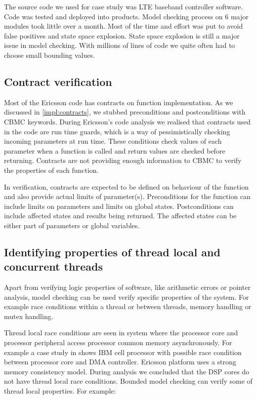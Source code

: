\ifericsson
The source code we used for case study was LTE baseband controller software. Code was tested and deployed into products. Model checking process on 6 major modules took little over a month. Most of the time and effort was put to avoid false positives and state space explosion. State space explosion is still a major issue in model checking. With millions of lines of code we quite often had to choose small bounding values.
\else

\fi

\subsection{Contract verification}
Most of the Ericsson code has contracts on function implementation. As we discussed in \autoref{impl:contracts}, we stubbed preconditions and postconditions with CBMC keywords. During Ericsson's code analysis we realised that contracts used in the code are run time guards, which is a way of pessimistically checking incoming parameters at run time. These conditions check values of each parameter when a function is called and return values are checked before returning. Contracts are not providing enough information to CBMC to verify the properties of each function. 

In verification, contracts are expected to be defined on behaviour of the function and also provide actual limits of parameter(s). Preconditions for the function can include limits on parameters and limits on global states. Postconditions can include affected states and results being returned. The affected states can be either part of parameters or global variables.

\subsection{Identifying properties of thread local and concurrent threads}

Apart from verifying logic properties of software, like arithmetic errors or pointer analysis, model checking can be used verify specific properties of the system. For example race conditions within a thread or between threads, memory handling or mutex handling. 

Thread local race conditions are seen in system where the processor core and processor peripheral access processor common memory asynchronously. For example a case study in \cite{Donaldson:2011:AAD:2034876.2034900} shows IBM cell processor with possible race condition between processor core and DMA controller. Ericsson platform uses a strong memory consistency model. During analysis we concluded that the DSP cores do not have thread local race conditions. Bounded model checking can verify some of thread local properties. For example:

